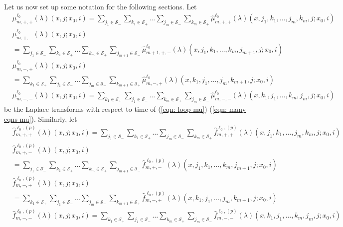 Let us now set up some notation for the following sections. Let 
\begin{align}
	&\widehat \mu_{m,+,+}^{\ell_0}(\lambda)( x,j;x_0,i) = \sum_{j_1\in\mathcal S_-} \sum_{k_1\in\mathcal S_+}\dots \sum_{j_m\in\mathcal S_-}\sum_{k_m\in\mathcal S_+}\widehat  \mu_{m,+,+}^{\ell_0}(\lambda)( x, j_1,k_1,\dots,j_m,k_m, j; x_0,i)  \label{eqn: mu advh}
	\\&\widehat \mu^{\ell_0}_{m,+,-}(\lambda)( x, j; x_0,i) \nonumber 
	\\&= \sum_{j_1\in\mathcal S_-} \sum_{k_1\in\mathcal S_+}\dots \sum_{k_m\in\mathcal S_+}\sum_{j_{m+1}\in\mathcal S_-}\widehat \mu^{\ell_0}_{m+1,+,-}(\lambda)( x, j_1,k_1,\dots,k_m,j_{m+1}, j; x_0,i)
	\\&\widehat \mu^{\ell_0}_{m,-,+}(\lambda)( x, j; x_0,i) \nonumber 
	\\&= \sum_{k_1\in\mathcal S_+} \sum_{j_1\in\mathcal S_-}\dots \sum_{j_m\in\mathcal S_-}\sum_{k_{m+1}\in\mathcal S_+}\widehat \mu^{\ell_0}_{m,-,+}(\lambda)( x, k_1,j_1,\dots,j_m,k_{m+1}, j; x_0,i) 
	\\&\widehat \mu^{\ell_0}_{m,-,-}(\lambda)( x, j; x_0,i) = \sum_{k_1\in\mathcal S_+} \sum_{j_1\in\mathcal S_-}\dots \sum_{k_m\in\mathcal S_+}\sum_{j_m\in\mathcal S_-}\widehat \mu^{\ell_0}_{m,-,-}(\lambda)( x, k_1, j_1,\dots,k_m,j_m, j; x_0,i) 
\end{align}
be the Laplace transforms with respect to time of (\ref{eqn: loop mu})-(\ref{eqn: many eqns mu}). Similarly, let
\begin{align}
            	&\widehat f^{\ell_0,(p)}_{m,+,+}(\lambda)(x,j;x_0,i) = \sum_{j_1\in\mathcal S_-} \sum_{k_1\in\mathcal S_+}\dots \sum_{j_m\in\mathcal S_-}\sum_{k_m\in\mathcal S_+}  \widehat f^{\ell_0,(p)}_{m,+,+}(\lambda)( x, j_1,k_1,\dots,j_m,k_m, j; x_0,i)\label{eqn: f advh}
		\\&\widehat f^{\ell_0,(p)}_{m,+,-}(\lambda)(x, j; x_0,i)  \nonumber
		\\&= \sum_{j_1\in\mathcal S_-} \sum_{k_1\in\mathcal S_+}\dots \sum_{k_m\in\mathcal S_+}\sum_{j_{m+1}\in\mathcal S_-}\widehat f^{\ell_0,(p)}_{m,+,-}(\lambda)(x, j_1,k_1,\dots,k_m,j_{m+1}, j; x_0,i) 
	\\&\widehat f^{\ell_0,(p)}_{m,-,+}(\lambda)(x, j; x_0,i) \nonumber
	\\&= \sum_{k_1\in\mathcal S_+} \sum_{j_1\in\mathcal S_-}\dots \sum_{j_m\in\mathcal S_-}\sum_{k_{m+1}\in\mathcal S_+}\widehat f^{\ell_0,(p)}_{m,-,+}(\lambda)(x, k_1,j_1,\dots,j_m,k_{m+1}, j; x_0,i)  
	\\&\widehat f^{\ell_0,(p)}_{m,-,-}(\lambda)(x, j; x_0,i)  = \sum_{k_1\in\mathcal S_+} \sum_{j_1\in\mathcal S_-}\dots \sum_{k_m\in\mathcal S_+}\sum_{j_m\in\mathcal S_-}\widehat f^{\ell_0,(p)}_{m,-,-}(\lambda)(x, k_1, j_1,\dots,k_m,j_m, j; x_0,i)  \label{eqn: asdlgjlll} 
\end{align}
